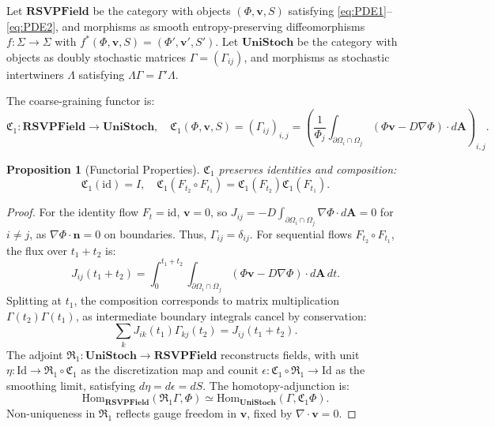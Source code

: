 \documentclass[12pt]{article}
\newtheorem{proposition}{Proposition}
\begin{document}
Let \(\mathbf{RSVPField}\) be the category with objects \((\Phi, \mathbf{v}, S)\) satisfying \eqref{eq:PDE1}--\eqref{eq:PDE2}, and morphisms as smooth entropy-preserving diffeomorphisms \(f: \Sigma \to \Sigma\) with \(f^*(\Phi, \mathbf{v}, S) = (\Phi', \mathbf{v}', S')\). Let \(\mathbf{UniStoch}\) be the category with objects as doubly stochastic matrices \(\Gamma = (\Gamma_{ij})\), and morphisms as stochastic intertwiners \(\Lambda\) satisfying \(\Lambda \Gamma = \Gamma' \Lambda\).

\begin{definition}
The coarse-graining functor is:
\[
\mathfrak{C}_1: \mathbf{RSVPField} \to \mathbf{UniStoch}, \quad \mathfrak{C}_1(\Phi, \mathbf{v}, S) = \left( \Gamma_{ij} \right)_{i,j} = \left( \frac{1}{\Phi_j} \int_{\partial \Omega_i \cap \Omega_j} (\Phi \mathbf{v} - D \nabla \Phi) \cdot d\mathbf{A} \right)_{i,j}.
\]
\end{definition}

\begin{proposition}[Functorial Properties]
\label{prop:functor}
\(\mathfrak{C}_1\) preserves identities and composition:
\[
\mathfrak{C}_1(\mathrm{id}) = I, \quad \mathfrak{C}_1(F_{t_2} \circ F_{t_1}) = \mathfrak{C}_1(F_{t_2}) \mathfrak{C}_1(F_{t_1}).
\]
\end{proposition}

\begin{proof}
For the identity flow \(F_t = \mathrm{id}\), \(\mathbf{v} = 0\), so \(J_{ij} = -D \int_{\partial \Omega_i \cap \Omega_j} \nabla \Phi \cdot d\mathbf{A} = 0\) for \(i \neq j\), as \(\nabla \Phi \cdot \mathbf{n} = 0\) on boundaries. Thus, \(\Gamma_{ij} = \delta_{ij}\). For sequential flows \(F_{t_2} \circ F_{t_1}\), the flux over \(t_1 + t_2\) is:
\[
J_{ij}(t_1 + t_2) = \int_0^{t_1 + t_2} \int_{\partial \Omega_i \cap \Omega_j} (\Phi \mathbf{v} - D \nabla \Phi) \cdot d\mathbf{A} \, dt.
\]
Splitting at \(t_1\), the composition corresponds to matrix multiplication \(\Gamma(t_2) \Gamma(t_1)\), as intermediate boundary integrals cancel by conservation:
\[
\sum_k J_{ik}(t_1) \Gamma_{kj}(t_2) = J_{ij}(t_1 + t_2).
\]
The adjoint \(\mathfrak{R}_1: \mathbf{UniStoch} \to \mathbf{RSVPField}\) reconstructs fields, with unit \(\eta: \mathrm{Id} \to \mathfrak{R}_1 \circ \mathfrak{C}_1\) as the discretization map and counit \(\epsilon: \mathfrak{C}_1 \circ \mathfrak{R}_1 \to \mathrm{Id}\) as the smoothing limit, satisfying \(d\eta = d\epsilon = dS\). The homotopy-adjunction is:
\[
\mathrm{Hom}_{\mathbf{RSVPField}}(\mathfrak{R}_1 \Gamma, \Phi) \simeq \mathrm{Hom}_{\mathbf{UniStoch}}(\Gamma, \mathfrak{C}_1 \Phi).
\]
Non-uniqueness in \(\mathfrak{R}_1\) reflects gauge freedom in \(\mathbf{v}\), fixed by \(\nabla \cdot \mathbf{v} = 0\).
\end{proof}
\end{document}
